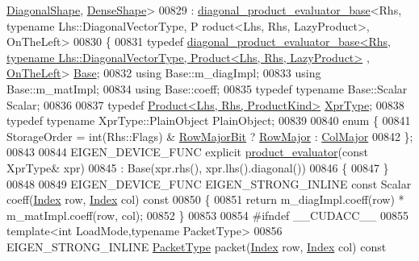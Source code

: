\begin{DoxyCode}
      \hyperlink{struct_eigen_1_1_diagonal_shape}{DiagonalShape}, \hyperlink{struct_eigen_1_1_dense_shape}{DenseShape}>
00829   : \hyperlink{struct_eigen_1_1internal_1_1diagonal__product__evaluator__base}{diagonal\_product\_evaluator\_base}<Rhs, typename Lhs::DiagonalVectorType, P
      roduct<Lhs, Rhs, LazyProduct>, OnTheLeft>
00830 \{
00831   \textcolor{keyword}{typedef} 
      \hyperlink{struct_eigen_1_1internal_1_1diagonal__product__evaluator__base}{diagonal\_product\_evaluator\_base<Rhs, typename Lhs::DiagonalVectorType, Product<Lhs, Rhs, LazyProduct>}
      , \hyperlink{group__enums_ggac22de43beeac7a78b384f99bed5cee0ba129609b3bdf23b071f5f86cf2f995ec4}{OnTheLeft}> \hyperlink{struct_eigen_1_1internal_1_1diagonal__product__evaluator__base}{Base};
00832   \textcolor{keyword}{using} Base::m\_diagImpl;
00833   \textcolor{keyword}{using} Base::m\_matImpl;
00834   \textcolor{keyword}{using} Base::coeff;
00835   \textcolor{keyword}{typedef} \textcolor{keyword}{typename} Base::Scalar Scalar;
00836   
00837   \textcolor{keyword}{typedef} \hyperlink{group___core___module_class_eigen_1_1_product}{Product<Lhs, Rhs, ProductKind>} \hyperlink{group___core___module_class_eigen_1_1_product}{XprType};
00838   \textcolor{keyword}{typedef} \textcolor{keyword}{typename} XprType::PlainObject PlainObject;
00839   
00840   \textcolor{keyword}{enum} \{
00841     StorageOrder = int(Rhs::Flags) & \hyperlink{group__flags_gae4f56c2a60bbe4bd2e44c5b19cbe8762}{RowMajorBit} ? \hyperlink{group__enums_ggaacded1a18ae58b0f554751f6cdf9eb13acfcde9cd8677c5f7caf6bd603666aae3}{RowMajor} : 
      \hyperlink{group__enums_ggaacded1a18ae58b0f554751f6cdf9eb13a0cbd4bdd0abcfc0224c5fcb5e4f6669a}{ColMajor}
00842   \};
00843 
00844   EIGEN\_DEVICE\_FUNC \textcolor{keyword}{explicit} \hyperlink{struct_eigen_1_1internal_1_1product__evaluator}{product\_evaluator}(\textcolor{keyword}{const} XprType& xpr)
00845     : Base(xpr.rhs(), xpr.lhs().diagonal())
00846   \{
00847   \}
00848   
00849   EIGEN\_DEVICE\_FUNC EIGEN\_STRONG\_INLINE \textcolor{keyword}{const} Scalar coeff(\hyperlink{namespace_eigen_a62e77e0933482dafde8fe197d9a2cfde}{Index} row, \hyperlink{namespace_eigen_a62e77e0933482dafde8fe197d9a2cfde}{Index} col)\textcolor{keyword}{ const}
00850 \textcolor{keyword}{  }\{
00851     \textcolor{keywordflow}{return} m\_diagImpl.coeff(row) * m\_matImpl.coeff(row, col);
00852   \}
00853   
00854 \textcolor{preprocessor}{#ifndef \_\_CUDACC\_\_}
00855   \textcolor{keyword}{template}<\textcolor{keywordtype}{int} LoadMode,\textcolor{keyword}{typename} PacketType>
00856   EIGEN\_STRONG\_INLINE \hyperlink{struct_eigen_1_1_packet_type}{PacketType} packet(\hyperlink{namespace_eigen_a62e77e0933482dafde8fe197d9a2cfde}{Index} row, \hyperlink{namespace_eigen_a62e77e0933482dafde8fe197d9a2cfde}{Index} col)\textcolor{keyword}{ const}

\end{DoxyCode}
